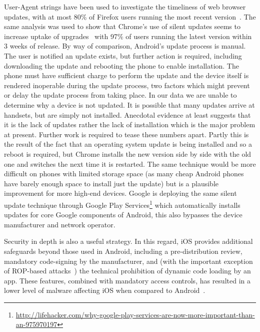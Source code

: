 \documentclass{sig-alternate}
\begin{document}
User-Agent strings have been used to investigate the timeliness of web browser updates, with at most 80\% of Firefox users running the most recent version~\cite{Frei2008}.
The same analysis was used to show that Chrome's use of silent updates seems to increase uptake of upgrades~\cite{Duebendorfer2010} with 97\% of users running the latest version within 3 weeks of release.
By way of comparison, Android's update process is manual.
The user is notified an update exists, but further action is required, including downloading the update and rebooting the phone to enable installation.
The phone must have sufficient charge to perform the update and the device itself is rendered inoperable during the update process, two factors which might prevent or delay the update process from taking place.
In our data we are unable to determine why a device is not updated. 
It is possible that many updates arrive at handsets, but are simply not installed.
Anecdotal evidence at least suggests that it is the lack of updates rather the lack of installation which is the major problem at present. Further work is required to tease these numbers apart.
Partly this is the result of the fact that an operating system update is being installed and so a reboot is required, but Chrome installs the new version side by side with the old one and switches the next time it is restarted.
The same technique would be more difficult on phones with limited storage space (as many cheap Android phones have barely enough space to install just the update) but is a plausible improvement for more high-end devices.
Google is deploying the same silent update technique through Google Play Services\footnote{\href{http://lifehacker.com/why-google-play-services-are-now-more-important-than-an-975970197}{http://lifehacker.com/why-google-play-services-are-now-more-important-than-an-975970197}} which automatically installs updates for core Google components of Android, this also bypasses the device manufacturer and network operator.

Security in depth is also a useful strategy.
In this regard, iOS provides additional safeguards beyond those used in Android, including a pre-distribution review, mandatory code-signing by the manufacturer, and (with the important exception of ROP-based attacks~\cite{Wang2013a}) the technical prohibition of dynamic code loading by an app.
These features, combined with mandatory access controls, has resulted in a lower level of malware affecting iOS when compared to Android~\cite{Felt2011}.
\end{document}
